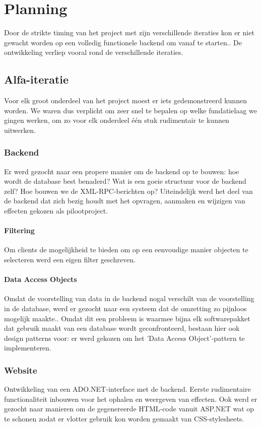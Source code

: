 \section{Planning}

Door de strikte timing van het project met zijn verschillende iteraties kon er niet gewacht worden op een volledig functionele backend om vanaf te starten.. De ontwikkeling verliep vooral rond de verschillende iteraties.

\subsection{Alfa-iteratie}
Voor elk groot onderdeel van het project moest er iets gedemonstreerd kunnen worden. We waren dus verplicht om zeer snel te bepalen op welke fundatielaag we gingen werken, om zo voor elk onderdeel één stuk rudimentair te kunnen uitwerken.

\subsubsection{Backend}
Er werd gezocht naar een propere manier om de backend op te bouwen: hoe wordt de database best benaderd? Wat is een goeie structuur voor de backend zelf? Hoe bouwen we de XML-RPC-berichten op?
Uiteindelijk werd het deel van de backend dat zich bezig houdt met het opvragen, aanmaken en wijzigen van effecten gekozen als pilootproject.
\paragraph{Filtering}
Om clients de mogelijkheid te bieden om op een eenvoudige manier objecten te selecteren werd een eigen filter geschreven.
\paragraph{Data Access Objects}
Omdat de voorstelling van data in de backend nogal verschilt van de voorstelling in de database, werd er gezocht naar een systeem dat de omzetting zo pijnloos mogelijk maakte.. Omdat dit een probleem is waarmee bijna elk softwarepakket dat gebruik maakt van een database wordt geconfronteerd, bestaan hier ook design patterns voor: er werd gekozen om het 'Data Access Object'-pattern te implementeren.

\subsubsection{Website}
Ontwikkeling van een ADO.NET-interface met de backend. Eerste rudimentaire functionaliteit inbouwen voor het ophalen en weergeven van effecten. Ook werd er gezocht naar manieren om de gegenereerde HTML-code vanuit ASP.NET wat op te schonen zodat er vlotter gebruik kon worden gemaakt van CSS-stylesheets.
